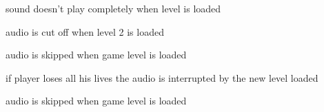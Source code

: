 
\begin{DoxyRefList}
\item[\label{bug__bug000001}%
\hypertarget{bug__bug000001}{}%
Class \hyperlink{class_door_sensor_script}{Door\-Sensor\-Script} ]sound doesn't play completely when level is loaded  
\item[\label{bug__bug000002}%
\hypertarget{bug__bug000002}{}%
Class \hyperlink{class_l1_player_script}{L1\-Player\-Script} ]audio is cut off when level 2 is loaded  
\item[\label{bug__bug000003}%
\hypertarget{bug__bug000003}{}%
Class \hyperlink{class_l2_ship_sensor}{L2\-Ship\-Sensor} ]audio is skipped when game level is loaded  
\item[\label{bug__bug000004}%
\hypertarget{bug__bug000004}{}%
Class \hyperlink{class_player}{Player} ]if player loses all his lives the audio is interrupted by the new level loaded  
\item[\label{bug__bug000005}%
\hypertarget{bug__bug000005}{}%
Class \hyperlink{class_ship_sensor}{Ship\-Sensor} ]audio is skipped when game level is loaded 
\end{DoxyRefList}